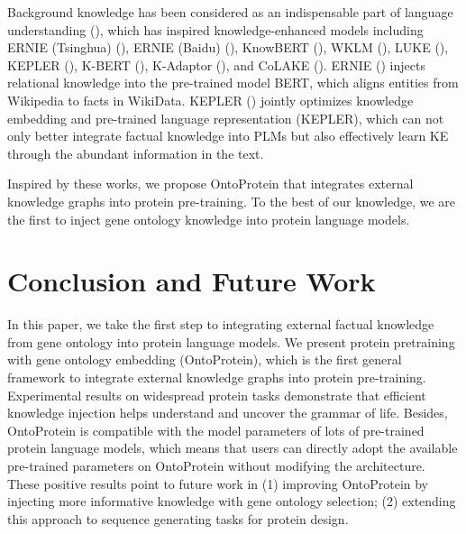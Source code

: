 Background knowledge has been considered as an indispensable part of language understanding (\citep{DBLP:conf/ijcai/ZhangDCCZZC21,DBLP:conf/acl/DengZLHTCHC20,DBLP:journals/corr/abs-2109-08306,DBLP:conf/naacl/ZhangDSWCZC19,DBLP:conf/coling/YuZDYZC20,DBLP:journals/corr/abs-2109-00895,DBLP:conf/kdd/ZhangJD0YCTHWHC21,DBLP:journals/corr/abs-2104-07650,DBLP:journals/corr/abs-2201-03335,DBLP:conf/cpaior/Silvestri0M21,DBLP:journals/corr/abs-2112-01404,DBLP:journals/corr/abs-2201-05742,DBLP:journals/corr/abs-2201-05575}), which has inspired knowledge-enhanced models including ERNIE (Tsinghua) (\cite{DBLP:conf/acl/ZhangHLJSL19}), ERNIE (Baidu) (\cite{DBLP:journals/corr/abs-1904-09223}), KnowBERT (\cite{DBLP:conf/emnlp/PetersNLSJSS19}), WKLM (\cite{DBLP:conf/iclr/XiongDWS20}), LUKE (\cite{DBLP:conf/emnlp/YamadaASTM20}), KEPLER (\cite{DBLP:journals/tacl/WangGZZLLT21}), K-BERT (\cite{DBLP:conf/aaai/LiuZ0WJD020}), K-Adaptor (\cite{DBLP:conf/acl/WangTDWHJCJZ21}), and CoLAKE (\cite{DBLP:conf/coling/SunSQGHHZ20}). 
ERNIE (\cite{DBLP:conf/acl/ZhangHLJSL19}) injects relational knowledge into the pre-trained model BERT, which aligns entities from Wikipedia to facts in WikiData.  
KEPLER (\cite{DBLP:journals/tacl/WangGZZLLT21}) jointly optimizes knowledge embedding and pre-trained language representation (KEPLER), which can not only better integrate factual knowledge into PLMs but also effectively learn KE through the abundant information in the text.
 
Inspired by these works, we propose OntoProtein that integrates external knowledge graphs into protein pre-training.
To the best of our knowledge, we are the first to inject gene ontology knowledge into protein language models. 

\section{Conclusion and Future Work}
In this paper, we take the first step to integrating external factual knowledge from gene ontology into protein language models.
We present protein pretraining with gene ontology embedding (OntoProtein), which is the first general framework to integrate external knowledge graphs into protein pre-training. 
Experimental results on widespread protein tasks demonstrate that efficient knowledge injection helps understand and uncover the grammar of life.
Besides, OntoProtein is compatible with the model parameters of lots of pre-trained protein language models, which means that users can directly adopt the available pre-trained parameters on OntoProtein without modifying the architecture. 
These positive results point to future work in 
(1) improving OntoProtein by injecting more informative knowledge with gene ontology selection; (2) extending this approach to sequence generating tasks for protein design.


